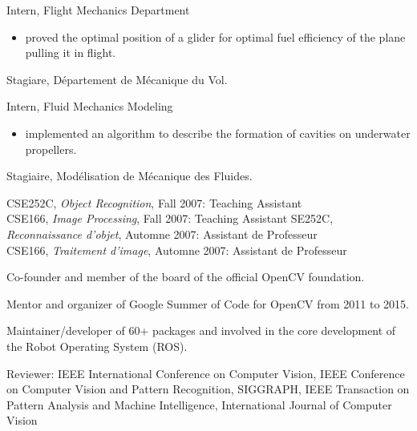 \documentclass{article}
\begin{document}
\begin{llist}
 
{
Intern, Flight Mechanics Department
\vspace{-0.33cm}
\begin{itemize}
 \item proved the optimal position of a glider for optimal fuel efficiency of the plane pulling it in flight.
\end{itemize}
}
{
Stagiare, D\'{e}partement de M\'{e}canique du Vol.
}

 
{
Intern, Fluid Mechanics Modeling
\vspace{-0.33cm}
\begin{itemize}
 \item implemented an algorithm to describe the formation of cavities on underwater propellers.
\end{itemize}
}
{
Stagiaire, Mod\'{e}lisation de M\'{e}canique des Fluides.
}

{
}
{
}
{
CSE252C, {\em Object Recognition}, Fall 2007: Teaching Assistant\\
CSE166, {\em Image Processing}, Fall 2007: Teaching Assistant
}
{
SE252C, {\em Reconnaissance d'objet}, Automne 2007: Assistant de Professeur\\
CSE166, {\em Traitement d'image}, Automne 2007: Assistant de Professeur
}

\newpage
{}
{
\vspace{-0.4cm}

Co-founder and member of the board of the official OpenCV foundation.

Mentor and organizer of Google Summer of Code for OpenCV from 2011 to 2015.

Maintainer/developer of 60+ packages and involved in the core development of the Robot Operating System (ROS).

Reviewer: IEEE International Conference on Computer Vision, IEEE Conference on Computer Vision and Pattern Recognition, 
SIGGRAPH, IEEE Transaction on Pattern Analysis and Machine Intelligence, International Journal of Computer Vision

}
\end{llist}
\end{document}

